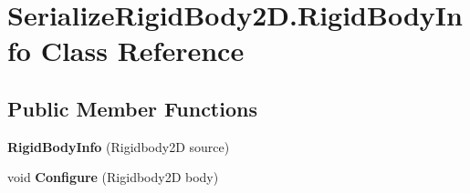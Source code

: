 \hypertarget{class_serialize_rigid_body2_d_1_1_rigid_body_info}{}\section{Serialize\+Rigid\+Body2\+D.\+Rigid\+Body\+Info Class Reference}
\label{class_serialize_rigid_body2_d_1_1_rigid_body_info}
\subsection*{Public Member Functions}
\begin{DoxyCompactItemize}
\item 
\mbox{\label{class_serialize_rigid_body2_d_1_1_rigid_body_info_a29d3ba0932fd7e82ce99b3fd92d61ec2}} 
{\bfseries Rigid\+Body\+Info} (Rigidbody2D source)
\item 
\mbox{\label{class_serialize_rigid_body2_d_1_1_rigid_body_info_a35d47af4c01c02171b70d5fafe6c44bc}} 
void {\bfseries Configure} (Rigidbody2D body)
\end{DoxyCompactItemize}
